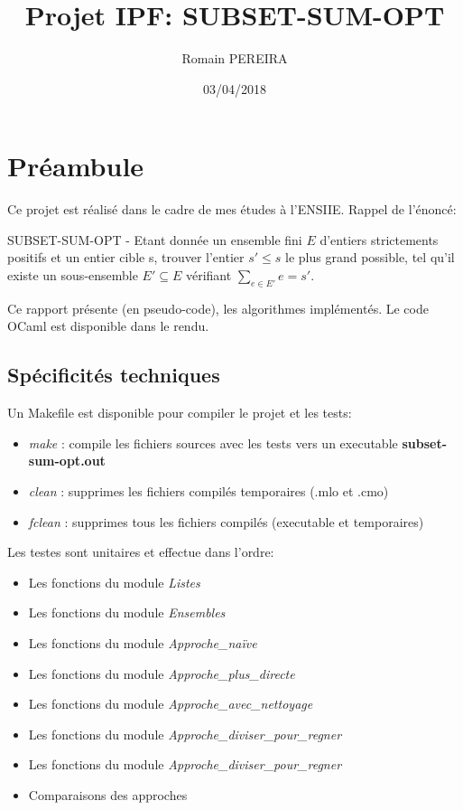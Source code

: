 \documentclass[10pt]{article}
\title{Projet IPF: SUBSET-SUM-OPT}
\author{Romain PEREIRA}
\date{03/04/2018}
\begin{document}
	\maketitle
	\tableofcontents

	\newpage
	\section{Préambule}

		Ce projet est réalisé dans le cadre de mes études à l'ENSIIE. Rappel de l'énoncé:
		\newline
		\begin{addmargin}[2em]{0em}
			\label{problem}{
			SUBSET-SUM-OPT - Etant donnée un ensemble fini $E$ d'entiers
			strictements positifs et un entier cible s, trouver l'entier
			$s' \leq s$ le plus grand possible, tel qu'il existe un
			sous-ensemble $E' \subseteq E$ vérifiant $\sum_{e \in E'}{e} = s'$.
			}
			\newline
		\end{addmargin}
		Ce rapport présente (en pseudo-code), les algorithmes implémentés.
		\newline
		Le code OCaml est disponible dans le rendu.
		\newline
		\subsection{Spécificités techniques}
			Un Makefile est disponible pour compiler le projet et les tests:
			\begin{itemize}[label=-]
				\setlength\itemsep{0.1em}
				\item \textit{make} : compile les fichiers sources avec les tests vers un executable \textbf{subset-sum-opt.out}
				\item \textit{clean} : supprimes les fichiers compilés temporaires (.mlo et .cmo)
				\item \textit{fclean} : supprimes tous les fichiers compilés (executable et temporaires)
			\end{itemize}
			Les testes sont unitaires et effectue dans l'ordre:
			\begin{itemize}[label=-]
				\item Les fonctions du module \textit{Listes}
				\item Les fonctions du module \textit{Ensembles}
				\item Les fonctions du module \textit{Approche\_naïve}
				\item Les fonctions du module \textit{Approche\_plus\_directe}
				\item Les fonctions du module \textit{Approche\_avec\_nettoyage}
				\item Les fonctions du module \textit{Approche\_diviser\_pour\_regner}
				\item Les fonctions du module \textit{Approche\_diviser\_pour\_regner}
				\item Comparaisons des approches
			\end{itemize}
\end{document}
